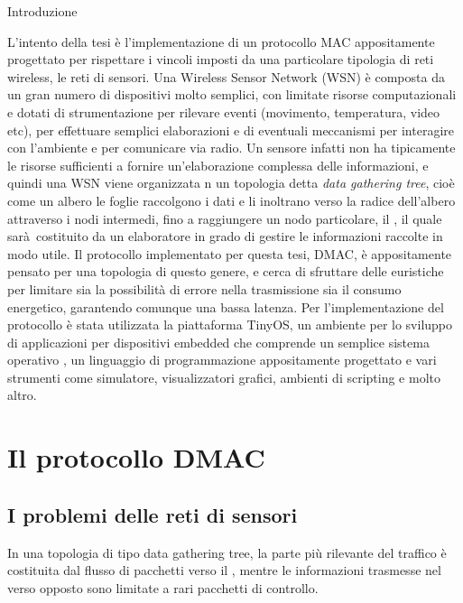 \documentclass[twoside,11pt,a4paper,italian,openany]{book}
\begin{document}
\begin{center}
\large{Introduzione}
\end{center}
\vspace{0.3in}
\hspace{\parindent}
L'intento della tesi è l'implementazione di un protocollo MAC appositamente progettato per 
rispettare i vincoli imposti da una particolare tipologia di reti wireless, le reti di sensori.
Una Wireless Sensor Network (WSN) è composta da un gran numero di dispositivi molto semplici, 
con limitate risorse computazionali e dotati di strumentazione per rilevare eventi (movimento,
temperatura, video etc), per effettuare semplici elaborazioni e di eventuali meccanismi per 
interagire con l'ambiente e per comunicare via radio. 
Un sensore infatti non ha tipicamente le risorse sufficienti a fornire un'elaborazione 
complessa delle informazioni, e quindi una WSN viene organizzata n un topologia detta \emph{data gathering tree}, cioè come un albero le foglie 
raccolgono i dati e li inoltrano verso la radice dell'albero attraverso i nodi intermedi, 
fino a raggiungere un nodo particolare, il \sink, il quale sarà costituito da un elaboratore in 
grado di gestire le informazioni raccolte in modo utile.
Il protocollo implementato per questa tesi, DMAC\cite{DMAC}, è appositamente pensato per una 
topologia di questo genere, e cerca di sfruttare delle euristiche per limitare sia la 
possibilità di errore nella trasmissione sia il consumo energetico, garantendo comunque una 
bassa latenza.
Per l'implementazione del protocollo è stata utilizzata la piattaforma TinyOS, un ambiente per 
lo sviluppo di applicazioni per dispositivi embedded che comprende un semplice sistema operativo
, un linguaggio di programmazione appositamente progettato e vari strumenti come simulatore, 
visualizzatori grafici, ambienti di scripting e molto altro. 
\tableofcontents
\chapter{Il protocollo DMAC}
\section{I problemi delle reti di sensori}
In una topologia di tipo data gathering tree, la parte più rilevante del 
traffico è costituita dal flusso di pacchetti verso il \sink, mentre le informazioni 
trasmesse nel verso opposto sono limitate a rari pacchetti di controllo.
\end{document}

